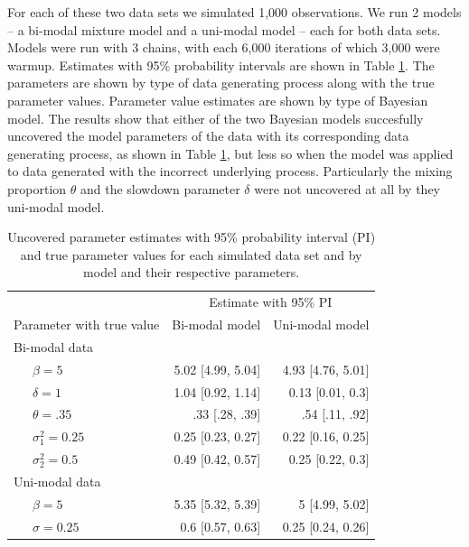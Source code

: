 \begin{appendix}
For each of these two data sets we simulated 1,000 observations. We run
2 models -- a bi-modal mixture model and a uni-modal model -- each for
both data sets. Models were run with 3 chains, with each 6,000
iterations of which 3,000 were warmup. Estimates with 95\% probability
intervals are shown in Table \ref{tab:simparam}. The parameters are
shown by type of data generating process along with the true parameter
values. Parameter value estimates are shown by type of Bayesian model.
The results show that either of the two Bayesian models succesfully
uncovered the model parameters of the data with its corresponding data
generating process, as shown in Table \ref{tab:simparam}, but less so
when the model was applied to data generated with the incorrect
underlying process. Particularly the mixing proportion \(\theta\) and
the slowdown parameter \(\delta\) were not uncovered at all by they
uni-modal model.

\begin{table}[tbp]

\begin{center}
\begin{threeparttable}

\caption{\label{tab:simparam}Uncovered parameter estimates with 95\% probability interval (PI) and true parameter values for each simulated data set and by model and their respective parameters.}

\begin{tabular}{lrr}
\toprule
 & \multicolumn{2}{c}{Estimate with 95\% PI} \\
\cmidrule(r){2-3}
Parameter with true value & \multicolumn{1}{c}{Bi-modal model} & \multicolumn{1}{c}{Uni-modal model}\\
\midrule
Bi-modal data &  & \\
\ \ \ $\beta = 5$ & 5.02 [4.99, 5.04] & 4.93 [4.76, 5.01]\\
\ \ \ $\delta = 1$ & 1.04 [0.92, 1.14] & 0.13 [0.01, 0.3]\\
\ \ \ $\theta = .35$ & .33 [.28, .39] & .54 [.11, .92]\\
\ \ \ $\sigma^2_1 = 0.25$ & 0.25 [0.23, 0.27] & 0.22 [0.16, 0.25]\\
\ \ \ $\sigma^2_2 = 0.5$ & 0.49 [0.42, 0.57] & 0.25 [0.22, 0.3]\\
Uni-modal data &  & \\
\ \ \ $\beta = 5$ & 5.35 [5.32, 5.39] & 5 [4.99, 5.02]\\
\ \ \ $\sigma = 0.25$ & 0.6 [0.57, 0.63] & 0.25 [0.24, 0.26]\\
\bottomrule
\end{tabular}


\end{threeparttable}
\end{center}
\end{table}
\end{appendix}
